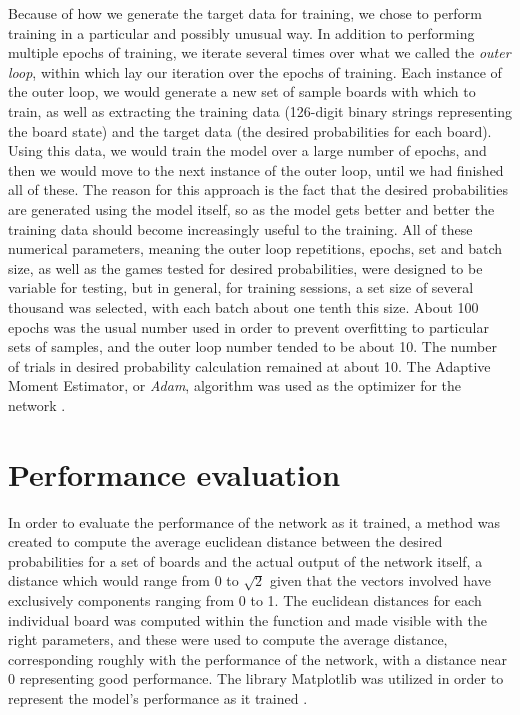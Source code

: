 \documentclass[12pt]{article}
\begin{document}
Because of how we generate the target data for training, we chose to perform training in a particular and possibly unusual way. In addition to performing multiple epochs of training, we iterate several times over what we called the \textit{outer loop}, within which lay our iteration over the epochs of training. Each instance of the outer loop, we would generate a new set of sample boards with which to train, as well as extracting the training data (126-digit binary strings representing the board state) and the target data (the desired probabilities for each board). Using this data, we would train the model over a large number of epochs, and then we would move to the next instance of the outer loop, until we had finished all of these. The reason for this approach is the fact that the desired probabilities are generated using the model itself, so as the model gets better and better the training data should become increasingly useful to the training. All of these numerical parameters, meaning the outer loop repetitions, epochs, set and batch size, as well as the games tested for desired probabilities, were designed to be variable for testing, but in general, for training sessions, a set size of several thousand was selected, with each batch about one tenth this size. About 100 epochs was the usual number used in order to prevent overfitting to particular sets of samples, and the outer loop number tended to be about 10. The number of trials in desired probability calculation remained at about 10. The Adaptive Moment Estimator, or \textit{Adam}, algorithm was used as the optimizer for the network \cite{Optimizers}.

\section{Performance evaluation}
In order to evaluate the performance of the network as it trained, a method was created to compute the average euclidean distance between the desired probabilities for a set of boards and the actual output of the network itself, a distance which would range from 0 to $\sqrt{2}$ given that the vectors involved have exclusively components ranging from 0 to 1. The euclidean distances for each individual board was computed within the function and made visible with the right parameters, and these were used to compute the average distance, corresponding roughly with the performance of the network, with a distance near 0 representing good performance. The library Matplotlib was utilized in order to represent the model’s performance as it trained \cite{Plot}.
\end{document}
